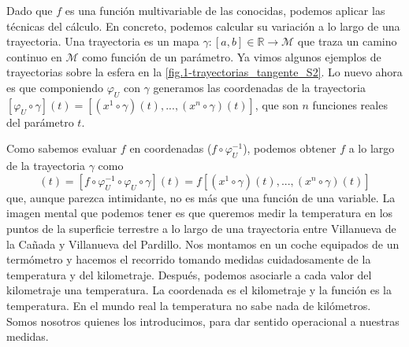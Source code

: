Dado que \(f\) es una función multivariable de las conocidas, podemos aplicar las técnicas del cálculo. En concreto, podemos calcular su variación a lo largo de una trayectoria. Una trayectoria es un mapa \(\gamma:[a, b]\in\mathbb{R}\rightarrow \mathcal{M}\) que traza un camino continuo en \(\mathcal{M}\) como función de un parámetro. Ya vimos algunos ejemplos de trayectorias sobre la esfera en la \cref{fig.1-trayectorias_tangente_S2}. Lo nuevo ahora es que componiendo \(\varphi_U\) con \(\gamma\) generamos las coordenadas de la trayectoria \([\varphi_U\circ \gamma](t) = \left[\left(x^{1}\circ\gamma\right)(t),...,\left(x^n\circ\gamma\right)(t)\right]\), que son \(n\) funciones reales del parámetro \(t\). 

Como sabemos evaluar \(f\) en coordenadas (\(f\circ\varphi_U^{-1}\)), podemos obtener \(f\) a lo largo de la trayectoria \(\gamma\) como
\begin{equation}
    [f\circ \gamma](t) = [f\circ\varphi_U^{-1}\circ\varphi_U\circ \gamma](t) = f\left[\left(x^1\circ\gamma\right)(t), ..., \left(x^n\circ\gamma\right)(t)\right]
\end{equation}
que, aunque parezca intimidante, no es más que una función de una variable. La imagen mental que podemos tener es que queremos medir la temperatura en los puntos de la superficie terrestre a lo largo de una trayectoria entre Villanueva de la Cañada y Villanueva del Pardillo. Nos montamos en un coche equipados de un termómetro y hacemos el recorrido tomando medidas cuidadosamente de la temperatura y del kilometraje. Después, podemos asociarle a cada valor del kilometraje una temperatura. La coordenada es el kilometraje y la función es la temperatura. En el mundo real la temperatura no sabe nada de kilómetros. Somos nosotros quienes los introducimos, para dar sentido operacional a nuestras medidas.

